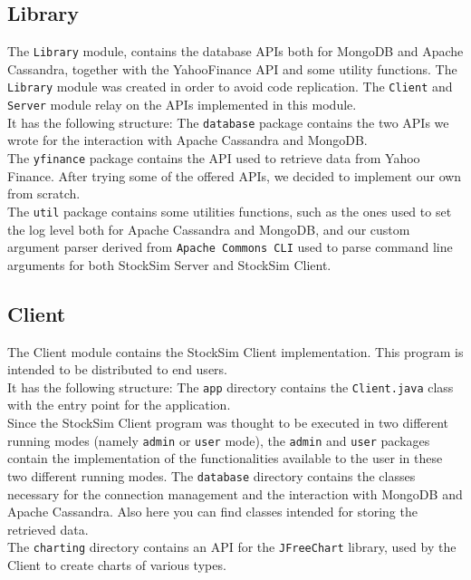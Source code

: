 \subsection{Library}
The \texttt{Library} module, contains the database APIs both for MongoDB and
Apache Cassandra, together with the YahooFinance API and some utility functions.
The \texttt{Library} module was created in order to avoid code replication. The
\texttt{Client} and \texttt{Server} module relay on the APIs implemented in this
module.\\
It has the following structure:
\vspace{0.2cm}
\vspace{0.2cm}
\noindent The \texttt{database} package contains the two APIs we wrote for the
interaction with Apache Cassandra and MongoDB.\\
The \texttt{yfinance} package contains the API used to retrieve data from
Yahoo Finance. After trying some of the offered APIs, we decided to implement
our own from scratch.\\
The \texttt{util} package contains some utilities functions, such as the ones 
used to set the log level both for Apache Cassandra and MongoDB, and our custom
argument parser derived from \texttt{Apache Commons CLI} used to parse command
line arguments for both StockSim Server and StockSim Client.
\subsection{Client}
The Client module contains the StockSim Client implementation. This program is
intended to be distributed to end users.\\
It has the following structure:
\vspace{0.2cm}
\vspace{0.2cm}
\noindent The \texttt{app} directory contains the \texttt{Client.java} class
with the entry point for the application.\\
Since the StockSim Client program was thought to be executed in two different
running modes (namely \texttt{admin} or \texttt{user} mode), the \texttt{admin}
and \texttt{user} packages contain the implementation of the functionalities
available to the user in these two different running modes.
The \texttt{database} directory contains the classes necessary for the
connection management and the interaction with MongoDB and Apache Cassandra.
Also here you can find classes intended for storing the retrieved data.\\
The \texttt{charting} directory contains an API for the \texttt{JFreeChart}
library, used by the Client to create charts of various types.
